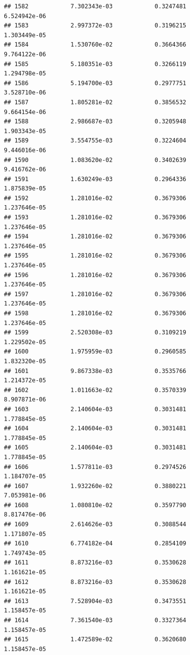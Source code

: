 \documentclass[
]{article}
\begin{document}
\begin{verbatim}
## 1582            7.302343e-03            0.3247481            6.524942e-06
## 1583            2.997372e-03            0.3196215            1.303449e-05
## 1584            1.530760e-02            0.3664366            9.764122e-06
## 1585            5.180351e-03            0.3266119            1.294798e-05
## 1586            5.194700e-03            0.2977751            3.528710e-06
## 1587            1.805281e-02            0.3856532            9.664154e-06
## 1588            2.986687e-03            0.3205948            1.903343e-05
## 1589            3.554755e-03            0.3224604            9.446016e-06
## 1590            1.083620e-02            0.3402639            9.416762e-06
## 1591            1.630249e-03            0.2964336            1.875839e-05
## 1592            1.281016e-02            0.3679306            1.237646e-05
## 1593            1.281016e-02            0.3679306            1.237646e-05
## 1594            1.281016e-02            0.3679306            1.237646e-05
## 1595            1.281016e-02            0.3679306            1.237646e-05
## 1596            1.281016e-02            0.3679306            1.237646e-05
## 1597            1.281016e-02            0.3679306            1.237646e-05
## 1598            1.281016e-02            0.3679306            1.237646e-05
## 1599            2.520308e-03            0.3109219            1.229502e-05
## 1600            1.975959e-03            0.2960585            1.832320e-05
## 1601            9.867338e-03            0.3535766            1.214372e-05
## 1602            1.011663e-02            0.3570339            8.907871e-06
## 1603            2.140604e-03            0.3031481            1.778845e-05
## 1604            2.140604e-03            0.3031481            1.778845e-05
## 1605            2.140604e-03            0.3031481            1.778845e-05
## 1606            1.577811e-03            0.2974526            1.184707e-05
## 1607            1.932260e-02            0.3880221            7.053981e-06
## 1608            1.080810e-02            0.3597790            8.817476e-06
## 1609            2.614626e-03            0.3088544            1.171807e-05
## 1610            6.774182e-04            0.2854109            1.749743e-05
## 1611            8.873216e-03            0.3530628            1.161621e-05
## 1612            8.873216e-03            0.3530628            1.161621e-05
## 1613            7.528904e-03            0.3473551            1.158457e-05
## 1614            7.361540e-03            0.3327364            1.158457e-05
## 1615            1.472589e-02            0.3620680            1.158457e-05

\end{verbatim}
\end{document}
